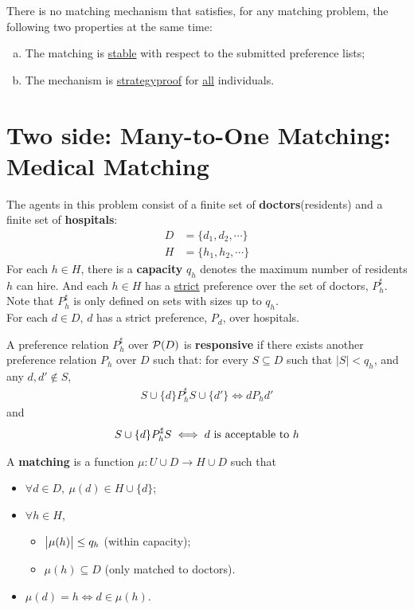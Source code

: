 \documentclass{article}
\begin{document}
	\begin{theorem}
		There is no matching mechanism that satisfies, for any matching problem, the following two properties at the same time:
		\begin{enumerate}[(a)]
			\item The matching is \ul{stable} with respect to the submitted preference lists;
			\item The mechanism is \ul{strategyproof} for \ul{all} individuals.
		\end{enumerate}
	\end{theorem}
	
	\section{Two side: Many-to-One Matching: Medical Matching}
	\begin{definition}
		The agents in this problem consist of a finite set of \textbf{doctors}(residents) and a finite set of \textbf{hospitals}:
	\begin{align}
		D &= \{d_1, d_2, \cdots \} \\
		H &= \{h_1, h_2, \cdots \}
	\end{align}
	For each $h \in H$, there is a \textbf{capacity} $q_h$ denotes the maximum number of residents $h$ can hire. And each $h \in H$ has a \ul{strict} preference over the set of doctors, $P_h^\sharp$. Note that $P_h^\sharp$ is only defined on sets with sizes up to $q_h$. \\
	For each $d \in D$, $d$ has a strict preference, $P_d$, over hospitals.
	\end{definition}
	
	\begin{definition}
		A preference relation $P_h^\sharp$ over $\mathcal{{P}}(D)$ is \textbf{responsive} if there exists another preference relation $P_h$ over $D$ such that: for every $S \subseteq D$ such that $|S| < q_h$, and any $d, d' \notin S$,
		\begin{align}
			S \cup \{d\} P_h^\sharp S \cup \{d'\} \iff d P_h d'
		\end{align}
		and
		\begin{align}
			S \cup \{d\} P_h^\sharp S \iff d \text{{ is acceptable to }} h
		\end{align}
	\end{definition}

	\begin{definition}
		A \textbf{matching} is a function $\mu: U \cup D \to H \cup D$ such that
		\begin{itemize}
			\item $\forall d \in D,\ \mu(d) \in H \cup \{d\}$;
			\item $\forall h \in H$,
			\begin{itemize}
				\item $\big \vert {\mu(h)} \big \vert \leq q_h$ (within capacity);
				\item $\mu(h) \subseteq D$ (only matched to doctors).
			\end{itemize}
			\item $\mu(d) = h \iff d \in \mu(h)$.
		\end{itemize}
	\end{definition}
	
\end{document}
